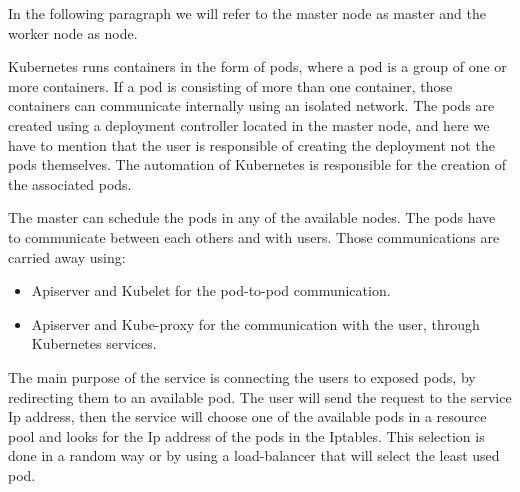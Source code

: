 \documentclass[letterpaper,twocolumn,10pt]{article}
\begin{document}
In the following paragraph we will refer to the master node as master and the worker node as node. 

Kubernetes runs containers in the form of pods, where a pod is a group of one or more containers. If a pod is consisting of more than one container, those containers can communicate internally using an isolated network. The pods are created using a deployment controller located in the master node, and here we have to mention that the user is responsible of creating the deployment not the pods themselves. The automation of Kubernetes is responsible for the creation of the associated pods.

The master can schedule the pods in any of the available nodes. The pods have to communicate between each others and with users. Those communications are carried away using: 

\begin{itemize}
	\item Apiserver and Kubelet for the pod-to-pod communication.
	\item Apiserver and Kube-proxy for the communication with the user, through Kubernetes services.
\end{itemize}

The main purpose of the service is connecting the users to exposed pods, by redirecting them to an available pod. The user will send the request to the service Ip address, then the service will choose one of the available pods in a resource pool and looks for the Ip address of the pods in the Iptables. This selection is done in a random way or by using a load-balancer that will select the least used pod.

\end{document}
